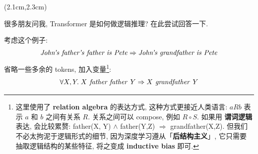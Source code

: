 \begin{preview}

\cc{
\title{\vspace{-1.5cm} \bfseries\color{blue}{\Large Transformer 的逻辑解释}}
}{
\title{\vspace{-1.5cm} \bfseries\color{blue}{\Large Transformer as Logic}}
}

\date{\vspace{-2cm}} %

\maketitle

\setcounter{section}{-1}

\begin{textblock*}{5cm}(2.1cm,2.3cm) %
{}
\end{textblock*}

\begin{minipage}{\textwidth}
\setlength{\parskip}{0.4\baselineskip}

很多朋友问我, Transformer 是如何做逻辑推理? 在此尝试回答一下.

考虑这个例子:
\begin{equation}
\text{\textit{John's father's father is Pete}} \Rightarrow \text{\textit{John's grandfather is Pete}}
\end{equation}
省略一些多余的 tokens, 加入变量\footnote{这里使用了 \textbf{relation algebra} 的表达方式, 这种方式更接近人类语言: $a R b$ 表示 $a$ 和 $b$ 之间有关系 $R$.  关系之间可以 compose, 例如 $R \circ S$.  如果用 \textbf{谓词逻辑} 表达, 会比较累赘: father(X, Y) $\wedge$ father(Y,Z) $\Rightarrow$ grandfather(X,Z).  但我们不必太拘泥于逻辑形式的细节, 因为深度学习遵从「\textbf{后结构主义}」, 它只需要 抽取逻辑结构的某些特征, 将之变成 \textbf{inductive bias} 即可.}:
\begin{equation}
\forall X, Y. \;  X \text{\textit{ father father }} Y \Rightarrow X \text{\textit{ grandfather }} Y
\end{equation}


\end{minipage}
\end{preview}
